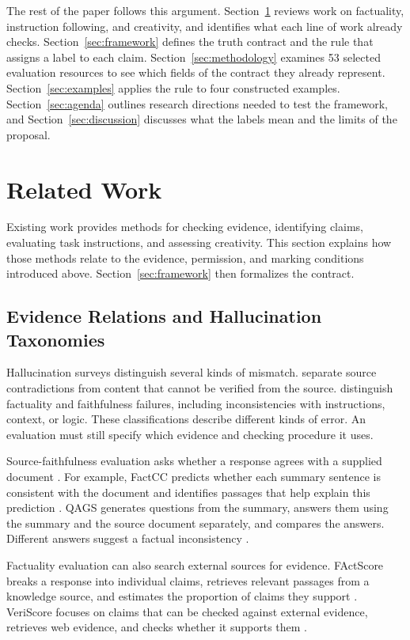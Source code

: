 \documentclass{clv2025}
\begin{document}
The rest of the paper follows this argument.
Section~\ref{sec:related} reviews work on factuality, instruction
following, and creativity, and identifies what each line of work already
checks. Section~\ref{sec:framework} defines the truth contract and the rule
that assigns a label to each claim. Section~\ref{sec:methodology} examines
53 selected evaluation resources to see which fields of the contract they
already represent. Section~\ref{sec:examples} applies the rule to four
constructed examples. Section~\ref{sec:agenda} outlines research directions needed to test the framework, and Section~\ref{sec:discussion} discusses what the
labels mean and the limits of the proposal.
\section{Related Work}\label{sec:related}

Existing work provides methods for checking evidence, identifying claims,
evaluating task instructions, and assessing creativity. This section explains
how those methods relate to the evidence, permission, and marking conditions
introduced above. Section~\ref{sec:framework} then formalizes the contract.

\subsection{Evidence Relations and Hallucination Taxonomies}

Hallucination surveys distinguish several kinds of mismatch.
\citet{ji_survey_2023} separate source contradictions from content that cannot
be verified from the source. \citet{huang_survey_2025} distinguish factuality
and faithfulness failures, including inconsistencies with instructions,
context, or logic. These classifications describe different kinds of error.
An evaluation must still specify which evidence and checking procedure it uses.

Source-faithfulness evaluation asks whether a response agrees with a supplied
document \citep{maynez_faithfulness_2020}. For example, FactCC predicts whether
each summary sentence is consistent with the document and identifies
passages that help explain this prediction \citep{kryscinski_evaluating_2020}.
QAGS generates questions from the summary, answers them using the summary
and the source document separately, and compares the answers. Different
answers suggest a factual inconsistency \citep{wang_asking_2020}.

Factuality evaluation can also search external sources for evidence.
FActScore breaks a response into individual claims, retrieves relevant
passages from a knowledge source, and estimates the proportion of claims
they support \citep{min_factscore_2023}. VeriScore focuses on claims that
can be checked against external evidence, retrieves web evidence, and
checks whether it supports them \citep{song_veriscore_2024}.
\end{document}
